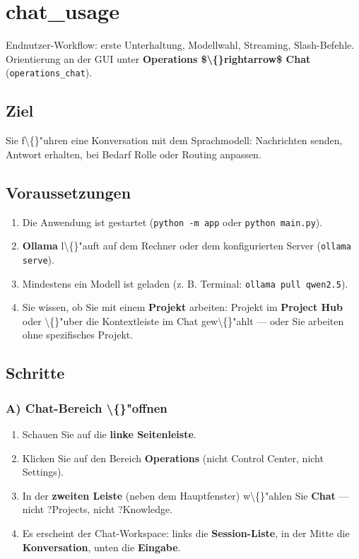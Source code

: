 \section{chat\_usage}

Endnutzer-Workflow: erste Unterhaltung, Modellwahl, Streaming, Slash-Befehle. Orientierung an der GUI unter \textbf{Operations \$\textbackslash\{\}rightarrow\$ Chat} (\texttt{operations\_chat}).

\subsection{Ziel}

Sie f\textbackslash\{\}"uhren eine Konversation mit dem Sprachmodell: Nachrichten senden, Antwort erhalten, bei Bedarf Rolle oder Routing anpassen.

\subsection{Voraussetzungen}

\begin{enumerate}
\item Die Anwendung ist gestartet (\texttt{python -m app} oder \texttt{python main.py}).
\item \textbf{Ollama} l\textbackslash\{\}"auft auf dem Rechner oder dem konfigurierten Server (\texttt{ollama serve}).
\item Mindestens ein Modell ist geladen (z. B. Terminal: \texttt{ollama pull qwen2.5}).
\item Sie wissen, ob Sie mit einem \textbf{Projekt} arbeiten: Projekt im \textbf{Project Hub} oder \textbackslash\{\}"uber die Kontextleiste im Chat gew\textbackslash\{\}"ahlt --- oder Sie arbeiten ohne spezifisches Projekt.
\end{enumerate}

\subsection{Schritte}

\subsubsection{A) Chat-Bereich \textbackslash\{\}"offnen}

\begin{enumerate}
\item Schauen Sie auf die \textbf{linke Seitenleiste}.
\item Klicken Sie auf den Bereich \textbf{Operations} (nicht Control Center, nicht Settings).
\item In der \textbf{zweiten Leiste} (neben dem Hauptfenster) w\textbackslash\{\}"ahlen Sie \textbf{Chat} --- nicht ?Projects\texttt{}, nicht ?Knowledge\texttt{}.
\item Es erscheint der Chat-Workspace: links die \textbf{Session-Liste}, in der Mitte die \textbf{Konversation}, unten die \textbf{Eingabe}.
\end{enumerate}

